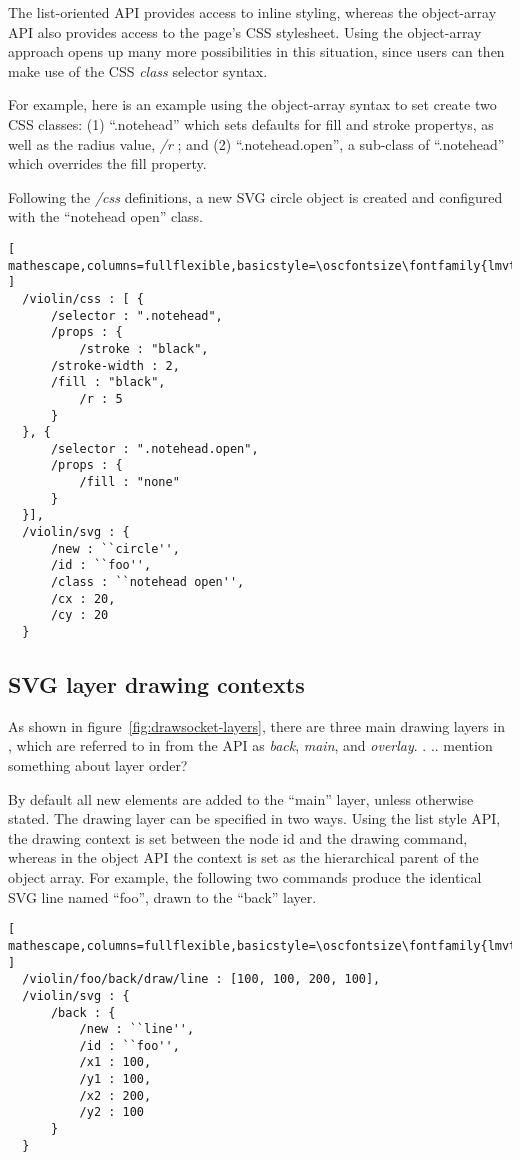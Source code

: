 The list-oriented API provides access to inline styling, whereas the object-array API also provides access to the page's CSS stylesheet.
Using the object-array approach opens up many more possibilities in this situation, since users can then make use of the CSS \textit{class} selector syntax.

For example, here is an example using the object-array syntax to set create two CSS classes: (1) ``.notehead'' which sets defaults for fill and stroke propertys, as well as the radius value, \textit{/r} ; and (2) ``.notehead.open'', a sub-class of ``.notehead'' which overrides the fill property. 

Following the \textit{/css} definitions, a new SVG circle object is created and configured with the ``notehead open'' class.

\begin{lstlisting}[ mathescape,columns=fullflexible,basicstyle=\oscfontsize\fontfamily{lmvtt}\selectfont ]
  /violin/css : [ {
      /selector : ".notehead",
      /props : {
          /stroke : "black",
	  /stroke-width : 2,
	  /fill : "black",
          /r : 5
      }
  }, {
      /selector : ".notehead.open",
      /props : {
          /fill : "none"
      }
  }],
  /violin/svg : {
      /new : ``circle'',
      /id : ``foo'',
      /class : ``notehead open'',
      /cx : 20,
      /cy : 20
  }
 \end{lstlisting}


\subsection{SVG layer drawing contexts}\label{sec:contexts}
As shown in figure~\ref{fig:drawsocket-layers}, there are three main drawing layers in \drawsocket, which are referred to in from the API as \textit{back}, \textit{main}, and \textit{overlay}. .
.. mention something about layer order?

By default all new elements are added to the ``main'' layer, unless otherwise stated. The drawing layer can be specified in two ways. Using the list style API, the drawing context is set between the node id and the drawing command, whereas in the object API the context is set as the hierarchical parent of the object array. 
For example, the following two commands produce the identical SVG line named ``foo'', drawn to the ``back'' layer.

\begin{lstlisting}[ mathescape,columns=fullflexible,basicstyle=\oscfontsize\fontfamily{lmvtt}\selectfont ]
  /violin/foo/back/draw/line : [100, 100, 200, 100],
  /violin/svg : {
      /back : {
          /new : ``line'',
          /id : ``foo'',
          /x1 : 100,
          /y1 : 100,
          /x2 : 200,
          /y2 : 100
      }
  }
 \end{lstlisting}


